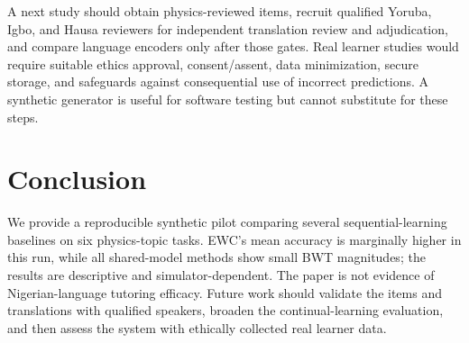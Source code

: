 \documentclass[conference]{IEEEtran}
\begin{document}
A next study should obtain physics-reviewed items, recruit qualified Yoruba, Igbo, and Hausa reviewers for independent translation review and adjudication, and compare language encoders only after those gates. Real learner studies would require suitable ethics approval, consent/assent, data minimization, secure storage, and safeguards against consequential use of incorrect predictions. A synthetic generator is useful for software testing but cannot substitute for these steps.
\section{Conclusion}
We provide a reproducible synthetic pilot comparing several sequential-learning baselines on six physics-topic tasks. EWC's mean accuracy is marginally higher in this run, while all shared-model methods show small BWT magnitudes; the results are descriptive and simulator-dependent. The paper is not evidence of Nigerian-language tutoring efficacy. Future work should validate the items and translations with qualified speakers, broaden the continual-learning evaluation, and then assess the system with ethically collected real learner data.


\end{document}
